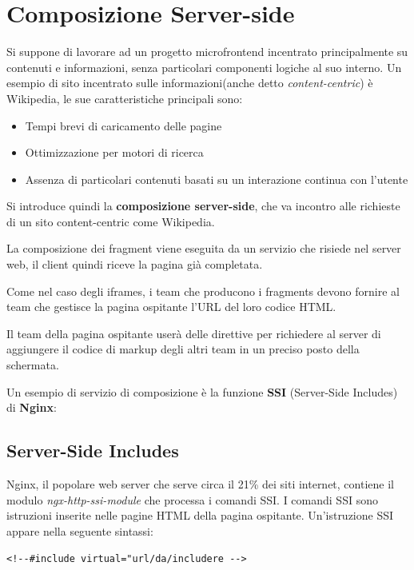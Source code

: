 \pagebreak

\section{Composizione Server-side}
Si suppone di lavorare ad un progetto microfrontend incentrato principalmente su contenuti e informazioni, senza particolari componenti logiche al suo interno.
Un esempio di sito incentrato sulle informazioni(anche detto \emph{content-centric}) è Wikipedia, le sue caratteristiche principali sono:
\begin{itemize}
    \item Tempi brevi di caricamento delle pagine
    \item Ottimizzazione per motori di ricerca
    \item Assenza di particolari contenuti basati su un interazione continua con l'utente
\end{itemize}

Si introduce quindi la \textbf{composizione server-side}, che va incontro alle richieste di un sito content-centric come Wikipedia.

La composizione dei fragment viene eseguita da un servizio che risiede nel server web, il client quindi riceve la pagina già completata.

Come nel caso degli iframes, i team che producono i fragments devono 
fornire al team che gestisce la pagina ospitante l'URL del loro codice HTML.

Il team della pagina ospitante userà delle direttive 
per richiedere al server di aggiungere il codice di markup degli altri team in un preciso posto della schermata.

Un esempio di servizio di composizione è la funzione \textbf{SSI} (Server-Side Includes) di \textbf{Nginx}:

\subsection{Server-Side Includes}

Nginx, il popolare web server che serve circa il 21\% dei siti internet\cite{nginx}, contiene il modulo \emph{ngx-http-ssi-module} che processa i comandi SSI.
 I comandi SSI sono istruzioni
inserite nelle pagine HTML della pagina ospitante. Un'istruzione SSI appare nella seguente sintassi:

   \begin{center}
    \verb|<!--#include virtual="url/da/includere -->|
   \end{center}

